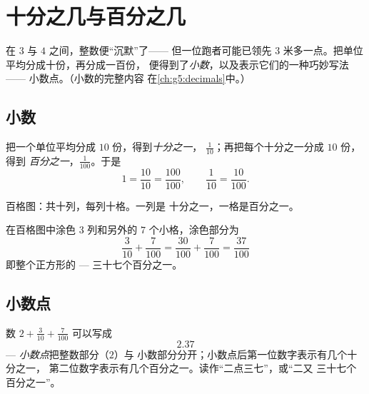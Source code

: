 \chapter{十分之几与百分之几}\label{ch:g4:decimals}

在 $3$ 与 $4$ 之间，整数便“沉默”了——
但一位跑者可能已领先 $3$ 米多一点。把单位平均分成十份，再分成一百份，
便得到了\emph{小数}，以及表示它们的一种巧妙写法——
小数点。（小数的完整内容
在\cref{ch:g5:decimals}中。）

\section{小数}

\begin{definition}[十分之一与百分之一]\label{def:g4:decimals:def}
把一个单位平均分成 $10$ 份，得到\emph{十分之一}，
$\frac{1}{10}$；再把每个十分之一分成 $10$ 份，得到
\emph{百分之一}，$\frac{1}{100}$。于是
\[
1 = \frac{10}{10} = \frac{100}{100},
\qquad
\frac{1}{10} = \frac{10}{100}.
\]
\end{definition}

\begin{omfigure}

{\small 百格图：共十列，每列十格。一列是
十分之一，一格是百分之一。}
\end{omfigure}

\begin{example}\label{ex:g4:decimals:count}
在百格图中涂色 $3$ 列和另外的 $7$ 个小格，涂色部分为
\[
\frac{3}{10} + \frac{7}{100} = \frac{30}{100} + \frac{7}{100}
= \frac{37}{100}
\]
即整个正方形的 --- 三十七个百分之一。
\end{example}

\section{小数点}

\begin{definition}[小数的写法]\label{def:g4:decimals:point}
数 $2 + \frac{3}{10} + \frac{7}{100}$ 可以写成
\[
2.37
\]
--- \emph{小数点}把整数部分（$2$）与
小数部分分开；小数点后第一位数字表示有几个十分之一，
第二位数字表示有几个百分之一。读作“二点三七”，或“二又
三十七个百分之一”。
\end{definition}

